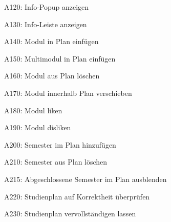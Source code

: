 \begin{usecase}{A120: Info-Popup anzeigen}
	
\end{usecase}

\begin{usecase}{A130: Info-Leiste anzeigen}
	
\end{usecase}

\begin{usecase}{A140: Modul in Plan einfügen}
	
\end{usecase}

\begin{usecase}{A150: Multimodul in Plan einfügen}
	
\end{usecase}

\begin{usecase}{A160: Modul aus Plan löschen}
	
\end{usecase}

\begin{usecase}{A170: Modul innerhalb Plan verschieben}
	
\end{usecase}

\begin{usecase}{A180: Modul liken}
	
\end{usecase}

\begin{usecase}{A190: Modul disliken}
	
\end{usecase}

\begin{usecase}{A200: Semester im Plan hinzufügen}
	
\end{usecase}

\begin{usecase}{A210: Semester aus Plan löschen}
	
\end{usecase}

\begin{usecase}{A215: Abgeschlossene Semester im Plan ausblenden}
	
\end{usecase}

\begin{usecase}{A220: Studienplan auf Korrektheit überprüfen}
	
\end{usecase}

\begin{usecase}{A230: Studienplan vervollständigen lassen}
	
\end{usecase}


	

\renewcommand{\arraystretch}{1.0}